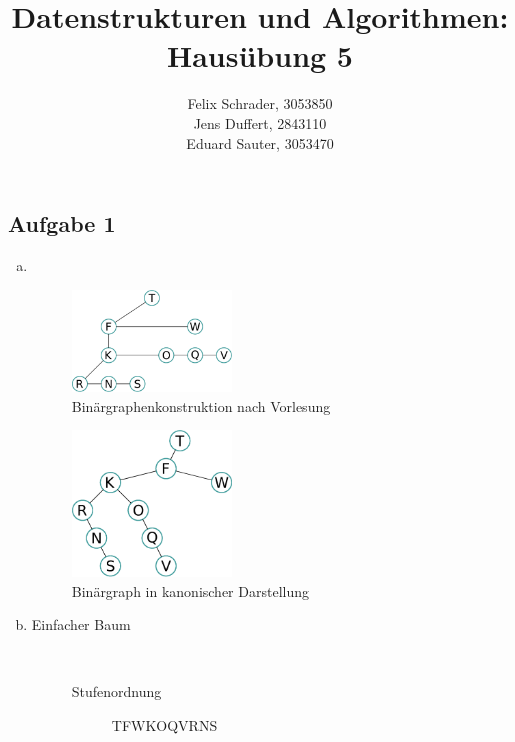 \documentclass[11pt]{article}
\author{
  Felix Schrader, 3053850 \\ 
  Jens Duffert, 2843110 \\
  Eduard Sauter, 3053470
}
\title{Datenstrukturen und Algorithmen: Haus\"ubung 5}
\begin{document}
\maketitle
\subsection*{Aufgabe 1}
\begin{enumerate}[a)] 
  \item $ $
    \begin{figure}[h!]
      \centering
      \includegraphics[width=0.4\textwidth]{5_1_a_graph}
      \caption{Binärgraphenkonstruktion nach Vorlesung}
    \end{figure}

    \begin{figure}[h!]
      \centering
      \includegraphics[width=0.4\textwidth]{5_1_a_graph_binary}
      \caption{Binärgraph in kanonischer Darstellung}
    \end{figure}
  \item 
    \begin{description}

      \item[Einfacher Baum] $ $
        \begin{description}

          \item[Stufenordnung] 
            TFWKOQVRNS


\end{description}
\end{description}
\end{enumerate}
\end{document}
